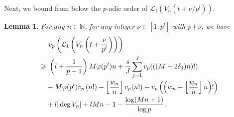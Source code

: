 \documentclass[12pt]{article}
\newtheorem{lemma}[theorem]{Lemma}
\numberwithin{equation}{section}
\begin{document}
\bigskip

Next, we bound from below the $p$-adic order of $\mathcal{L}_1(V_n(t+\nu/p^l))$. 
\begin{lemma}\label{lem_v_p(L_1(V_n(shift)))}
For any $n\in \mathbb{N}$, for any integer $\nu \in [1,p^l]$ with $p \nmid \nu$, we have
\begin{align}
&~ v_p\left( \mathcal{L}_1\left( V_n\left( t+\frac{\nu}{p^l} \right) \right) \right) \notag\\
\geqslant& ~\left( l + \frac{1}{p-1} \right)M\varphi(p^l)n + \frac{s}{J} \sum_{j=1}^{J} v_p(((M-2\delta_j)n)!) \notag\\ 
&- M\varphi(p^l)v_p\left( n! \right) - \left\lfloor \frac{w_n}{n} \right\rfloor v_p(n!) - v_p\left( \left( w_n -\left\lfloor \frac{w_n}{n} \right\rfloor n \right)! \right) \notag\\
&+ l|\deg V_n|  +lMn -1-\frac{\log(Mn+1)}{\log p}. \label{v_p(L_1(V_n(shift)))}
\end{align}
\end{lemma}
\end{document}
